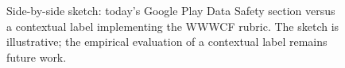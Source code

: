 \begin{figure}[!tbp]
{\begin{tikzpicture}
\end{tikzpicture}%
}
\caption{Side-by-side sketch: today's Google Play Data Safety section
versus a contextual label implementing the WWWCF rubric. The sketch is
illustrative; the empirical evaluation of a contextual label remains
future work.}
\label{fig:mockup-redesign}
\end{figure}